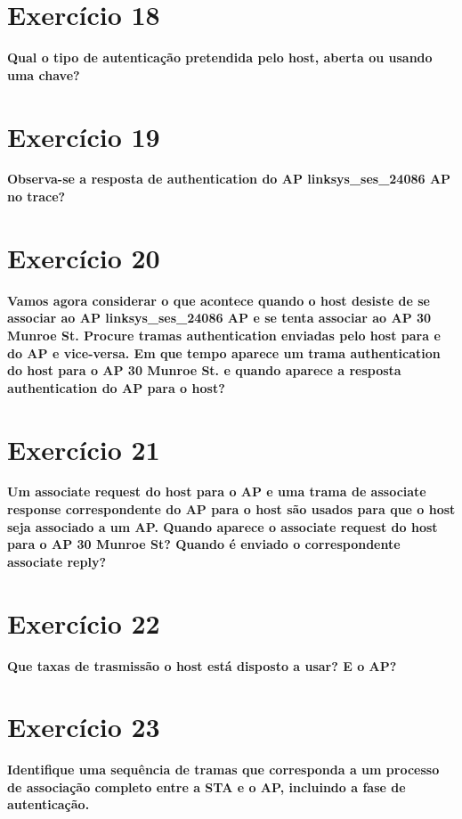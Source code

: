 \documentclass[a4paper]{report}
\begin{document}
\section{Exercício 18}
\textbf{Qual o tipo de autenticação pretendida pelo host, aberta ou usando uma
    chave?}\\

\section{Exercício 19}
\textbf{Observa-se a resposta de authentication do AP linksys\_ses\_24086 AP no
    trace?}\\

\section{Exercício 20}
\textbf{Vamos agora considerar o que acontece quando o host desiste de se
    associar ao AP linksys\_ses\_24086 AP e se tenta associar ao AP 30 Munroe
    St. Procure tramas authentication enviadas pelo host para e do AP e
    vice-versa. Em que tempo aparece um trama authentication do host para o AP
    30 Munroe St. e quando aparece a resposta authentication do AP para o
    host?}\\

\section{Exercício 21}
\textbf{Um associate request do host para o AP e uma trama de associate response
    correspondente do AP para o host são usados para que o host seja associado a
    um AP. Quando aparece o associate request do host para o AP 30 Munroe St?
    Quando é enviado o correspondente associate reply?}\\

\section{Exercício 22}
\textbf{Que taxas de trasmissão o host está disposto a usar? E o AP?}\\

\section{Exercício 23}
\textbf{Identifique uma sequência de tramas que corresponda a um processo de
    associação completo entre a STA e o AP, incluindo a fase de autenticação.}\\
\end{document}
